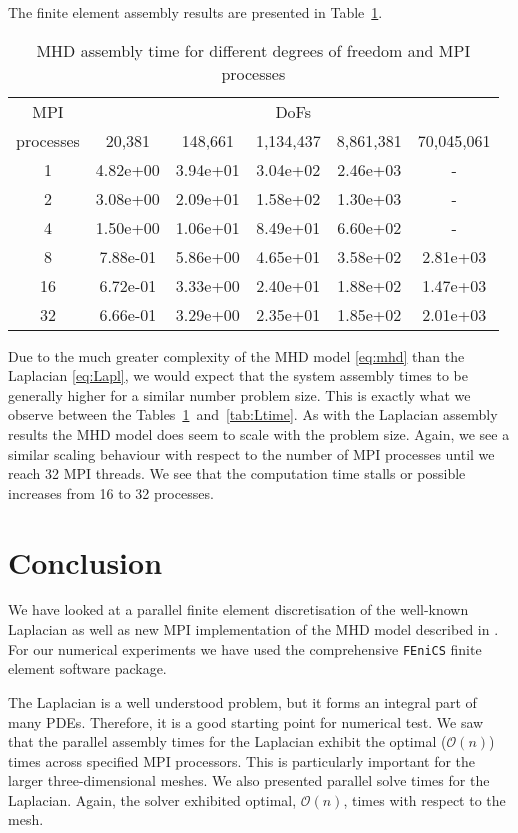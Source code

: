 \documentclass[11pt]{article}
\newcommand{\fenics}{{\tt FEniCS} }
\begin{document}
The finite element assembly results are presented in Table~\ref{tab:MHD}.
\begin{table}[h!]
    \centering
    \begin{tabular}{|c|ccccc|}
        \hline
        MPI & \multicolumn{5}{c|}{DoFs}\\
        processes &  20,381   &   148,661  &   1,134,437  &   8,861,381  & 70,045,061 \\
        \hline
        1 & 4.82e+00 &  3.94e+01 &  3.04e+02 &  2.46e+03 &  - \\
        2 & 3.08e+00 &  2.09e+01 &  1.58e+02 &  1.30e+03 &  - \\
        4 & 1.50e+00 &  1.06e+01 &  8.49e+01 &  6.60e+02 &  - \\
        8 & 7.88e-01 &  5.86e+00 &  4.65e+01 &  3.58e+02 &  2.81e+03 \\
        16 & 6.72e-01 &  3.33e+00 &  2.40e+01 &  1.88e+02 &  1.47e+03 \\
        32 & 6.66e-01 &  3.29e+00 &  2.35e+01 &  1.85e+02 &  2.01e+03 \\
        \hline
    \end{tabular}
    \caption{MHD assembly time for different degrees of freedom and MPI processes}
    \label{tab:MHD}
\end{table}
Due to the much greater complexity of the MHD model \eqref{eq:mhd} than the Laplacian \eqref{eq:Lapl}, we would expect that the system assembly times to be generally higher for a similar number problem size. This is exactly what we observe between the Tables~\ref{tab:MHD}~and~\ref{tab:Ltime}. As with the Laplacian assembly results the MHD model does seem to scale with the problem size. Again, we see a similar scaling behaviour with respect to the number of MPI processes until we reach 32 MPI threads. We see that the computation time stalls or possible increases from 16 to 32 processes.

\section{Conclusion}

We have looked at a parallel finite element discretisation of the well-known Laplacian as well as new MPI implementation of the MHD model described in \cite{schotzau2004mixed}. For our numerical experiments we have used the comprehensive \fenics finite element software package.

The Laplacian is a well understood problem, but it forms an integral part of many PDEs. Therefore, it is a good starting point for numerical test. We saw that the parallel assembly times for the Laplacian exhibit the optimal ($\mathcal{O}(n)$) times across specified MPI processors. This is particularly important for the larger three-dimensional meshes. We also presented parallel solve times for the Laplacian. Again, the solver exhibited optimal, $\mathcal{O}(n)$, times with respect to the mesh.
\end{document}
